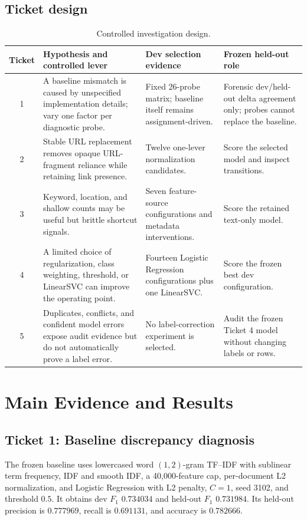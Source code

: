 \documentclass[10pt]{article}
\newcommand{\code}[1]{\texttt{\detokenize{#1}}}
\newcommand{\fscore}{\ensuremath{F_1}}
\begin{document}
\subsection{Ticket design}

\begin{table}[htbp]
\centering
\small
\begin{tabularx}{\textwidth}{c Y Y Y}
\toprule
Ticket & Hypothesis and controlled lever & Dev selection evidence & Frozen held-out role \\
 & A baseline mismatch is caused by unspecified implementation details; vary one factor per diagnostic probe. & Fixed 26-probe matrix; baseline itself remains assignment-driven. & Forensic dev/held-out delta agreement only; probes cannot replace the baseline. \\
2 & Stable URL replacement removes opaque URL-fragment reliance while retaining link presence. & Twelve one-lever normalization candidates. & Score the selected \code{url_replace} model and inspect transitions. \\
3 & Keyword, location, and shallow counts may be useful but brittle shortcut signals. & Seven feature-source configurations and metadata interventions. & Score the retained text-only model. \\
4 & A limited choice of regularization, class weighting, threshold, or LinearSVC can improve the operating point. & Fourteen Logistic Regression configurations plus one LinearSVC. & Score the frozen best dev configuration. \\
5 & Duplicates, conflicts, and confident model errors expose audit evidence but do not automatically prove a label error. & No label-correction experiment is selected. & Audit the frozen Ticket 4 model without changing labels or rows. \\
\bottomrule
\end{tabularx}
\caption{Controlled investigation design.}
\label{tab:ticket-design}
\end{table}

\section{Main Evidence and Results}

\subsection{Ticket 1: Baseline discrepancy diagnosis}

The frozen baseline uses lowercased word $(1,2)$-gram TF--IDF with sublinear term frequency, IDF and smooth IDF, a 40,000-feature cap, per-document L2 normalization, and \code{liblinear} Logistic Regression with L2 penalty, $C=1$, seed 3102, and threshold $0.5$. It obtains dev \fscore{} $0.734034$ and held-out \fscore{} $0.731984$. Its held-out precision is $0.777969$, recall is $0.691131$, and accuracy is $0.782666$.
\end{document}
